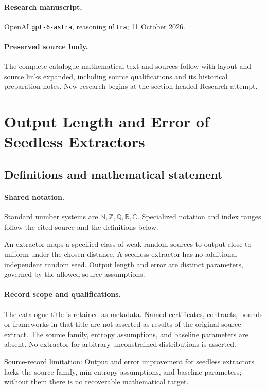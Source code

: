 \documentclass[11pt]{article}
\begin{document}
\paragraph{Research manuscript.} OpenAI \texttt{gpt-6-astra}, reasoning \texttt{ultra}; 11 October 2026.
\paragraph{Preserved source body.} The complete catalogue mathematical text and sources follow with layout and source links expanded, including source qualifications and its historical preparation notes. New research begins at the section headed Research attempt.

\section{Output Length and Error of Seedless Extractors}\label{statement}

\subsection{Definitions and mathematical statement}

\paragraph{Shared notation.}Standard number systems are $\mathbb N,\mathbb Z,\mathbb Q,\mathbb R,\mathbb C$. Specialized notation and index ranges follow the cited source and the definitions below.


An extractor maps a specified class of weak random sources to output close to uniform under the chosen distance. A seedless extractor has no additional independent random seed. Output length and error are distinct parameters, governed by the allowed source assumptions.
\paragraph{Record scope and qualifications.}
The catalogue title is retained as metadata. Named certificates, contracts, bounds or frameworks in that title are not asserted as results of the original source extract.
The source family, entropy assumptions, and baseline parameters are absent. No extractor for arbitrary unconstrained distributions is asserted.

Source-record limitation: Output and error improvement for seedless extractors lacks the source family, min-entropy assumptions, and baseline parameters; without them there is no recoverable mathematical target.
\end{document}
